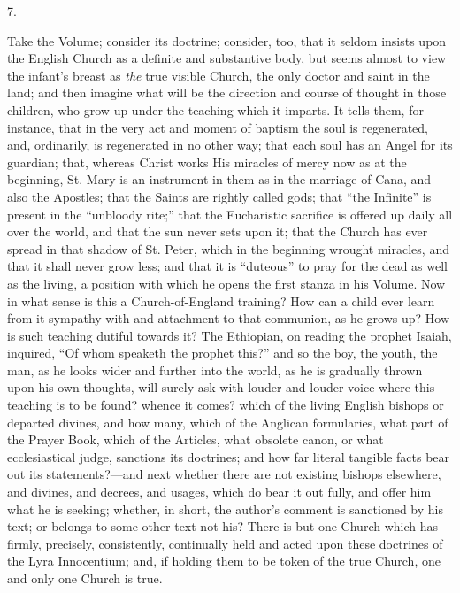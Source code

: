 7.

Take the Volume; consider its doctrine; consider,
too, that it seldom insists upon the English Church as a definite and
substantive body, but seems almost to view the infant's breast as \emph{the}
true visible Church, the only doctor and saint in the land; and then
imagine what will be the direction and course of thought in those
children, who grow up under the teaching which it imparts. It
tells them, for instance, that in the very act and moment of baptism
the soul is regenerated, and, ordinarily, is regenerated in no other
way; that each soul has an Angel for its guardian; that, whereas
Christ works His miracles of mercy now as at the beginning, St. Mary
is an instrument in them as in the marriage of Cana, and also the
Apostles; that the Saints are rightly called gods; that ``the Infinite''
is present in the ``unbloody rite;'' that the Eucharistic sacrifice is
offered up daily all over the world, and that the sun never sets upon
it; that the Church has ever spread in that shadow of St. Peter, which
in the beginning wrought miracles, and that it shall never grow less;
and that it is ``duteous'' to pray for the dead as well as the living, a
position with which he opens the first stanza in his Volume. Now in
what sense is this a Church-of-England training? How can a child ever
learn from it sympathy with and attachment to that communion, as he
grows up? How is such teaching dutiful towards it? The Ethiopian, on
reading the prophet Isaiah, inquired, ``Of whom speaketh the prophet
this?'' and so the boy, the youth, the man, as he looks wider and
further into the world, as he is gradually thrown upon his own
thoughts, will surely ask with louder and louder voice where this
teaching is to be found? whence it comes? which of the living English
bishops or departed divines, and how many, which of the Anglican
formularies, what part of the Prayer Book, which of the Articles, what
obsolete canon, or what ecclesiastical judge, sanctions its doctrines;
and how far literal tangible facts bear out its statements?—and next
whether there are not existing bishops elsewhere, and divines, and
decrees, and usages, which do bear it out fully, and offer him what he
is seeking; whether, in short, the author's comment is
sanctioned by his text; or belongs to some other text not his? There
is but one Church which has firmly, precisely, consistently,
continually held and acted upon these doctrines of the Lyra
Innocentium; and, if holding them to be token of the true Church, one
and only one Church is true.

